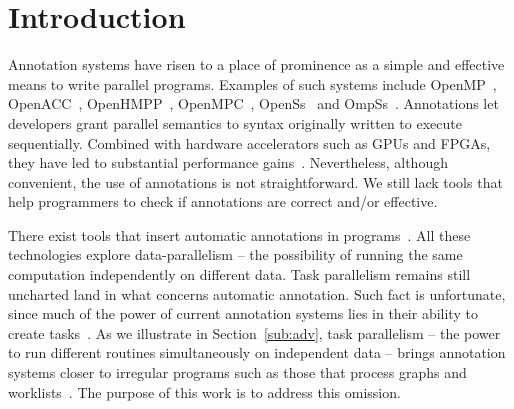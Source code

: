 \documentclass[sigplan,10pt,screen]{acmart}
\newcommand{\guido}[1]{\noindent\textcolor{magenta}{Guido: {#1}}}
\newcommand{\guido}[1]{}
\begin{document}
\section{Introduction}
\label{sec:intro}

Annotation systems have risen to a place of prominence as a simple and
effective means to write parallel programs.
Examples of such systems include OpenMP~\cite{JaegerCP15},
OpenACC~\cite{OpenACC20}, OpenHMPP~\cite{Andion14}, OpenMPC~\cite{Lee10},
OpenSs~\cite{MeenderinckJ11} and
OmpSs~\cite{bueno:icpp:2011, duran:ppl:2011}.
Annotations let developers grant parallel
semantics to syntax originally written to execute sequentially.
Combined with hardware accelerators such as GPUs and FPGAs, they have led
to substantial performance gains~\cite{Bertolli14,Mendonca17,Poesia17}.
Nevertheless, although convenient, the use of annotations is not straightforward.
We still lack tools that help programmers to check if annotations
are correct and/or effective.

There exist tools that insert automatic annotations in
programs~\cite{Mendonca16,Pingali11}.
All these technologies explore data-parallelism -- the possibility of running
the same computation independently on different data.
Task parallelism remains still uncharted land in what
concerns automatic annotation.
Such fact is unfortunate, since much of the power of current annotation
systems lies in their ability to create tasks~\cite{Ayguade09}.
As we illustrate in Section~\ref{sub:adv}, task parallelism -- the power to run
different routines simultaneously on independent data -- brings annotation systems
closer to irregular programs such as those that process graphs and
worklists~\cite{Pingali11}.
The purpose of this work is to address this omission.
\end{document}
